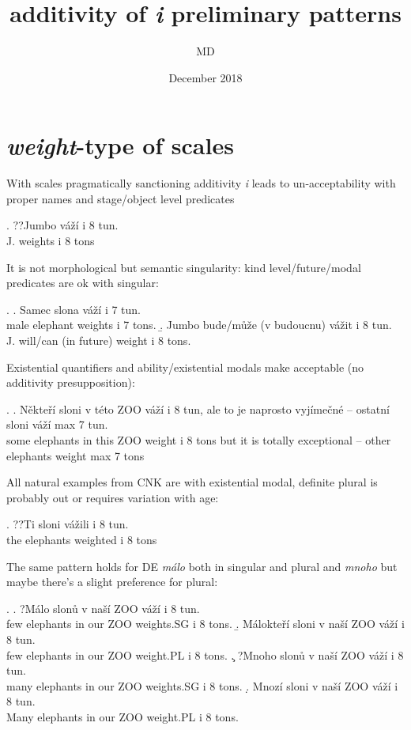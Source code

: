\documentclass{article}
\title{additivity of \textit{i} preliminary patterns}
\author{MD}
\date{December 2018}
\begin{document}
\maketitle

\section{\textit{weight}-type of scales}


With scales pragmatically sanctioning additivity \textit{i} leads to un-acceptability with proper names and stage/object level predicates

\ex. ??Jumbo váží i 8 tun.\\
J. weights i 8 tons

It is not morphological but semantic singularity: kind level/future/modal predicates are ok with singular:

\ex. \a. Samec slona váží i 7 tun.\\
male elephant weights i 7 tons.
\b. Jumbo bude/může (v budoucnu) vážit i 8 tun.\\
J. will/can (in future) weight i 8 tons.

Existential quantifiers and ability/existential modals make \LLast acceptable (no additivity presupposition):

\ex. \a. Někteří sloni v této ZOO váží i 8 tun, ale to je naprosto vyjímečné -- ostatní sloni váží max 7 tun.\\
some elephants in this ZOO weight i 8 tons but it is totally exceptional -- other elephants weight max 7 tons

All natural examples from CNK are with existential modal, definite plural is probably out or requires variation with age:

\ex. ??Ti sloni vážili i 8 tun.\\
the elephants weighted i 8 tons

The same pattern holds for DE \textit{málo} both in singular and plural and \textit{mnoho} but maybe there's a slight preference for plural:

\ex. \a. ?Málo slonů v naší ZOO váží i 8 tun.\\
few elephants in our ZOO weights.SG i 8 tons.
\b. Málokteří sloni v naší ZOO váží i 8 tun.\\
few elephants in our ZOO weight.PL i 8 tons.
\c. ?Mnoho slonů v naší ZOO váží i 8 tun.\\
many elephants in our ZOO weights.SG i 8 tons.
\d. Mnozí sloni v naší ZOO váží i 8 tun.\\
Many elephants in our ZOO weight.PL i 8 tons.
\end{document}
